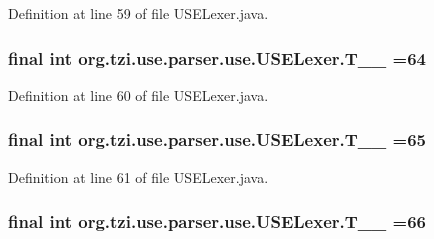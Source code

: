 Definition at line 59 of file U\-S\-E\-Lexer.\-java.

\hypertarget{classorg_1_1tzi_1_1use_1_1parser_1_1use_1_1_u_s_e_lexer_a1847253dce5b0f25e7d66418ec5758cd}{
\subsubsection[{T\-\_\-\-\_\-64}]{\setlength{\rightskip}{0pt plus 5cm}final int org.\-tzi.\-use.\-parser.\-use.\-U\-S\-E\-Lexer.\-T\-\_\-\-\_ =64\hspace{0.3cm}{\ttfamily [static]}}}\label{classorg_1_1tzi_1_1use_1_1parser_1_1use_1_1_u_s_e_lexer_a1847253dce5b0f25e7d66418ec5758cd}


Definition at line 60 of file U\-S\-E\-Lexer.\-java.

\hypertarget{classorg_1_1tzi_1_1use_1_1parser_1_1use_1_1_u_s_e_lexer_a57c505facea381574d13e2bb2fd4653a}{
\subsubsection[{T\-\_\-\-\_\-65}]{\setlength{\rightskip}{0pt plus 5cm}final int org.\-tzi.\-use.\-parser.\-use.\-U\-S\-E\-Lexer.\-T\-\_\-\-\_ =65\hspace{0.3cm}{\ttfamily [static]}}}\label{classorg_1_1tzi_1_1use_1_1parser_1_1use_1_1_u_s_e_lexer_a57c505facea381574d13e2bb2fd4653a}


Definition at line 61 of file U\-S\-E\-Lexer.\-java.

\hypertarget{classorg_1_1tzi_1_1use_1_1parser_1_1use_1_1_u_s_e_lexer_aa01ee79e291a766f8e30aa66dcf307b6}{
\subsubsection[{T\-\_\-\-\_\-66}]{\setlength{\rightskip}{0pt plus 5cm}final int org.\-tzi.\-use.\-parser.\-use.\-U\-S\-E\-Lexer.\-T\-\_\-\-\_ =66\hspace{0.3cm}{\ttfamily [static]}}}\label{classorg_1_1tzi_1_1use_1_1parser_1_1use_1_1_u_s_e_lexer_aa01ee79e291a766f8e30aa66dcf307b6}


